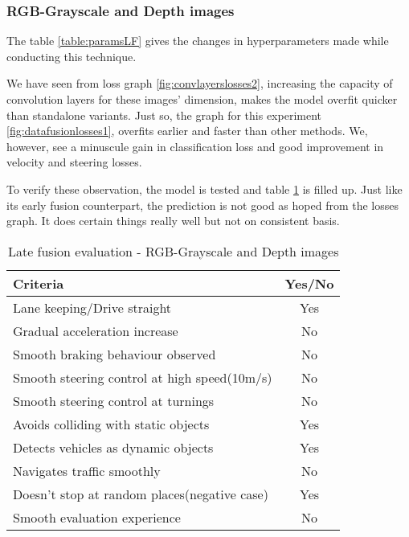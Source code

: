 \subsubsection*{RGB-Grayscale and Depth images}

The table \ref{table:paramsLF} gives the changes in hyperparameters made while conducting
this technique.

We have seen from loss graph \ref{fig:convlayerslosses2}, increasing the capacity of
convolution layers for these images' dimension, makes the model overfit quicker than
standalone variants. Just so, the graph for this experiment \ref{fig:datafusionlosses1},
overfits earlier and faster than other methods. We, however, see a minuscule gain in
classification loss and good improvement in velocity and steering losses.

To verify these observation, the model is tested and table \ref{table:latefusionrgbdepth}
is filled up. Just like its early fusion counterpart, the prediction is not good as hoped
from the losses graph. It does certain things really well but not on consistent basis.
\begin{table}[!ht]
    \centering
\begin{tabular}{lc}
    \toprule
    Criteria  & Yes/No\\\midrule
    Lane keeping/Drive straight  & Yes  \\
    Gradual acceleration increase  & No\\
    Smooth braking behaviour observed & No \\
    Smooth steering control at high speed(10m/s) & No \\
    Smooth steering control at turnings & No\\
    Avoids colliding with static objects & Yes \\
    Detects vehicles as dynamic objects & Yes \\
    Navigates traffic smoothly & No\\
    Doesn't stop at random places(negative case) & Yes \\
    Smooth evaluation experience & No \\\bottomrule
\end{tabular}
\caption{Late fusion evaluation - RGB-Grayscale and Depth images}
\label{table:latefusionrgbdepth}
\end{table}

